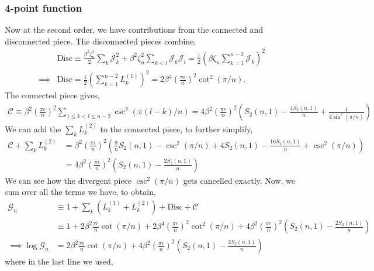 \documentclass[11pt]{article}
\newcommand{\ep}{\epsilon}
\newcommand{\nn}{\nonumber}
\newcommand{\lb}{\left(}
\newcommand{\rb}{\right)}
\begin{document}
\subsubsection{4-point function}
Now at the second order, we have contributions from the connected and disconnected piece. The disconnected pieces combine,
\begin{align}
&\text{Disc} \equiv \frac{\beta^2\zeta_n^2}{2}
\sum_k\mathcal J_k^2
+
\beta^2\zeta_n^2
\sum_{k<l}\mathcal J_k\mathcal J_l
=
\frac12
\left(
\beta\zeta_n
\sum_{k=1}^{n-2}
\mathcal J_k
\right)^2 \\
\implies & \text{Disc} = \frac{1}{2}\lb \sum_{k=1}^{n-2}L_k^{(1)} \rb^2 = 2\beta^4 \lb \frac{\pi \ep}{n}\rb ^2 \cot^2(\pi/n).
\end{align}
The connected piece gives,
\begin{align}
    \mathcal{C} \equiv \beta^2 \lb \frac{\pi \ep}{n}\rb^2 \sum_{1\leq k <l \leq n-2}\csc^2 (\pi (l-k)/n)  = 4\beta^2 \lb \frac{\pi \ep}{n}\rb^2  \lb S_2(n,1) - \frac{4S_2(n,1)}{n} + \frac{1}{4\sin^2(\pi/n)}\rb 
\end{align}
We can add the $\sum_kL_k^{(2)}$ to the connected piece, to further simplify,
\begin{align}
    \mathcal{C} + \sum_k L_k^{(2)}&=\beta^2 \lb \frac{\pi \ep}{n}\rb^2 \lb \frac{8}{n}S_2(n,1) - \csc^2(\pi/n) + 4S_2(n,1) - \frac{16S_2(n,1)}{n} + \csc^2(\pi/n)  \rb \nn \\
    &= 4\beta^2 \lb \frac{\pi \ep}{n}\rb^2 \lb S_2(n,1) - \frac{2S_2(n,1)}{n}\rb
\end{align}
We can see how the divergent piece $\csc^2(\pi/n)$ gets cancelled exactly.
Now, we sum over all the terms we have, to obtain,
\begin{align}
    \mathcal{G}_n & \equiv  1 + \sum_k \lb L_k^{(1)} + L_k^{(2)} \rb + \text{Disc} + \mathcal{C} \\
    &\equiv 1 + 2\beta^2 \frac{\pi \ep}{n}\cot(\pi/n) + 2\beta^4 \lb \frac{\pi \ep}{n}\rb ^2 \cot^2(\pi/n) + 4\beta^2 \lb \frac{\pi \ep}{n}\rb^2 \lb S_2(n,1) - \frac{2S_2(n,1)}{n}\rb
    \\
    \implies \log \mathcal{G}_n  & = 2\beta^2 \frac{\pi \ep}{n}\cot(\pi/n) + 4\beta^2 \lb \frac{\pi \ep}{n}\rb^2 \lb S_2(n,1) - \frac{2S_2(n,1)}{n}\rb
\end{align}
where in the last line we used,
\end{document}
